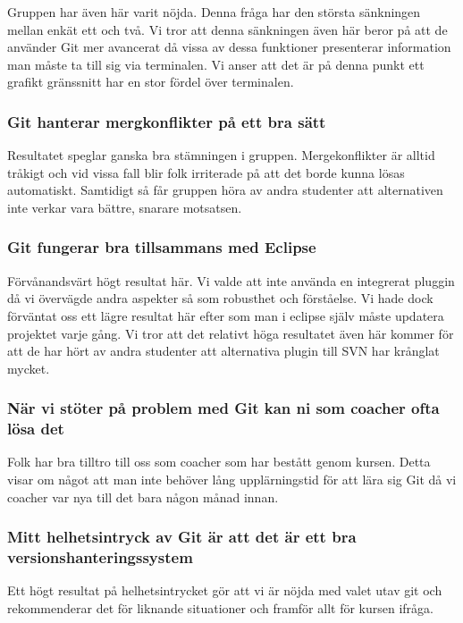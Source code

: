 Gruppen har även här varit nöjda. Denna fråga har den största sänkningen mellan enkät ett och två. Vi tror att denna sänkningen även här beror på att de använder Git mer avancerat då vissa av dessa funktioner presenterar information man måste ta till sig via terminalen. Vi anser att det är på denna punkt ett grafikt gränssnitt har en stor fördel över terminalen. 

\subsubsection{Git hanterar mergkonflikter på ett bra sätt}

Resultatet speglar ganska bra stämningen i gruppen. Mergekonflikter är alltid tråkigt och vid vissa fall blir folk irriterade på att det borde kunna lösas automatiskt. Samtidigt så får gruppen höra av andra studenter att alternativen inte verkar vara bättre, snarare motsatsen.  

\subsubsection{Git fungerar bra tillsammans med Eclipse}

Förvånandsvärt högt resultat här. Vi valde att inte använda en integrerat pluggin då vi övervägde andra aspekter så som robusthet och förståelse. Vi hade dock förväntat oss ett lägre resultat här efter som man i eclipse själv måste updatera projektet varje gång. Vi tror att det relativt höga resultatet även här kommer för att de har hört av andra studenter att alternativa plugin till SVN har krånglat mycket. 

\subsubsection{När vi stöter på problem med Git kan ni som coacher ofta lösa det}

Folk har bra tilltro till oss som coacher som har bestått genom kursen. Detta visar om något att man inte behöver lång upplärningstid för att lära sig Git då vi coacher var nya till det bara någon månad innan. 

\subsubsection{Mitt helhetsintryck av Git är att det är ett bra versionshanteringssystem}

Ett högt resultat på helhetsintrycket gör att vi är nöjda med valet utav git och rekommenderar det för liknande situationer och framför allt för kursen ifråga. 

